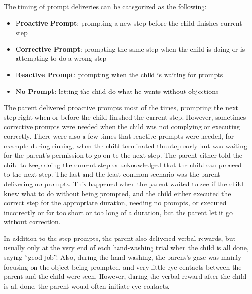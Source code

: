 \documentclass{ut-thesis}
\begin{document}
The timing of prompt deliveries can be categorized as the following:
\begin{itemize}
	\item \textbf{Proactive Prompt}: prompting a new step before the child finishes current step
	\item \textbf{Corrective Prompt}: prompting the same step when the child is doing or is attempting to do a wrong step
	\item \textbf{Reactive Prompt}: prompting when the child is waiting for prompts
	\item \textbf{No Prompt}: letting the child do what he wants without objections
\end{itemize}
The parent delivered proactive prompts most of the times, prompting the next step right when or before the child finished the current step.  However, sometimes corrective prompts were needed when the child was not complying or executing correctly.  There were also a few times that reactive prompts were needed, for example during rinsing, when the child terminated the step early but was waiting for the parent's permission to go on to the next step.  The parent either told the child to keep doing the current step or acknowledged that the child can proceed to the next step.  The last and the least common scenario was the parent delivering no prompts.  This happened when the parent waited to see if the child knew what to do without being prompted, and the child either executed the correct step for the appropriate duration, needing no prompts, or executed incorrectly or for too short or too long of a duration, but the parent let it go without correction.

In addition to the step prompts, the parent also delivered verbal rewards, but usually only at the very end of each hand-washing trial when the child is all done, saying ``good job''.  Also, during the hand-washing, the parent's gaze was mainly focusing on the object being prompted, and very little eye contacts between the parent and the child were seen.  However, during the verbal reward after the child is all done, the parent would often initiate eye contacts.
\end{document}
